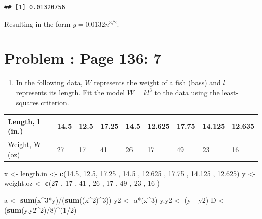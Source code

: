\documentclass[]{article}
\newenvironment{Shaded}{\begin{snugshade}}{\end{snugshade}}
\newcommand{\KeywordTok}[1]{\textcolor[rgb]{0.13,0.29,0.53}{\textbf{{#1}}}}
\newcommand{\DecValTok}[1]{\textcolor[rgb]{0.00,0.00,0.81}{{#1}}}
\newcommand{\FloatTok}[1]{\textcolor[rgb]{0.00,0.00,0.81}{{#1}}}
\newcommand{\StringTok}[1]{\textcolor[rgb]{0.31,0.60,0.02}{{#1}}}
\newcommand{\NormalTok}[1]{{#1}}
\providecommand{\tightlist}{%
  \setlength{\itemsep}{0pt}\setlength{\parskip}{0pt}}
\begin{document}
\begin{verbatim}
## [1] 0.01320756
\end{verbatim}

Resulting in the form \(y = 0.0132n^{3/2}\).

\section{Problem : Page 136: 7}\label{problem-page-136-7}

\begin{enumerate}
\def\labelenumi{\alph{enumi}.}
\tightlist
\item
  In the following data, \(W\) represents the weight of a fish (bass)
  and \(l\) represents its length. Fit the model \(W = kl^3\) to the
  data using the least-squares criterion.
\end{enumerate}

\begin{table}[!htbp]
\centering
\label{my-label}
\begin{tabular}{l|llllllll}
Length, l (in.) & 14.5 & 12.5 & 17.25 & 14.5 & 12.625 & 17.75 & 14.125 & 12.635 \\ \hline
Weight, W (oz)  & 27   & 17   & 41    & 26   & 17     & 49    & 23     & 16  
\end{tabular}
\end{table}

\begin{Shaded}
\begin{Highlighting}[]
\NormalTok{x <-}\StringTok{ }\NormalTok{length.in <-}\StringTok{ }\KeywordTok{c}\NormalTok{(}\FloatTok{14.5}\NormalTok{, }\FloatTok{12.5}\NormalTok{, }\FloatTok{17.25} \NormalTok{, }\FloatTok{14.5} \NormalTok{, }\FloatTok{12.625} \NormalTok{, }\FloatTok{17.75} \NormalTok{, }\FloatTok{14.125} \NormalTok{, }\FloatTok{12.625}\NormalTok{)}
\NormalTok{y <-}\StringTok{ }\NormalTok{weight.oz <-}\StringTok{ }\KeywordTok{c}\NormalTok{(}\DecValTok{27} \NormalTok{, }\DecValTok{17}   \NormalTok{, }\DecValTok{41}    \NormalTok{, }\DecValTok{26}   \NormalTok{, }\DecValTok{17}     \NormalTok{, }\DecValTok{49}    \NormalTok{, }\DecValTok{23}     \NormalTok{, }\DecValTok{16} \NormalTok{)}

\NormalTok{a <-}\StringTok{ }\KeywordTok{sum}\NormalTok{(x^}\DecValTok{3}\NormalTok{*y)/(}\KeywordTok{sum}\NormalTok{((x^}\DecValTok{2}\NormalTok{)^}\DecValTok{3}\NormalTok{))}
\NormalTok{y2 <-}\StringTok{ }\NormalTok{a*(x^}\DecValTok{3}\NormalTok{)}
\NormalTok{y.y2 <-}\StringTok{ }\NormalTok{(y -}\StringTok{ }\NormalTok{y2)}
\NormalTok{D <-}\StringTok{ }\NormalTok{(}\KeywordTok{sum}\NormalTok{(y.y2^}\DecValTok{2}\NormalTok{)/}\DecValTok{8}\NormalTok{)^(}\DecValTok{1}\NormalTok{/}\DecValTok{2}\NormalTok{)}
\end{Highlighting}
\end{Shaded}
\end{document}
